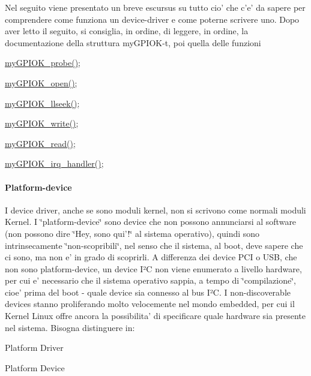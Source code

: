 Nel seguito viene presentato un breve escursus su tutto cio' che c'e' da sapere per comprendere come funziona un device-\/driver e come poterne scrivere uno. Dopo aver letto il seguito, si consiglia, in ordine, di leggere, in ordine, la documentazione della struttura my\+G\+P\+I\+O\+K-\/t, poi quella delle funzioni
\begin{DoxyItemize}
\item \hyperlink{group___kernel-_module_gae40973a06d72f7c41a9af07513a62307}{my\+G\+P\+I\+O\+K\+\_\+probe()};
\item \hyperlink{group___kernel-_module_gad013759c18fbf6ea96005b9b3bfa5b4e}{my\+G\+P\+I\+O\+K\+\_\+open()};
\item \hyperlink{group___kernel-_module_ga66e7f726b72320a272b633ecbaecefff}{my\+G\+P\+I\+O\+K\+\_\+llseek()};
\item \hyperlink{group___kernel-_module_ga1eea0f6c86e8966ba9b701da57502aad}{my\+G\+P\+I\+O\+K\+\_\+write()};
\item \hyperlink{group___kernel-_module_ga90ac339df9c02ae5f11a2a7727adc923}{my\+G\+P\+I\+O\+K\+\_\+read()};
\item \hyperlink{group___kernel-_module_ga2fc230a12a97aa63e43b2dc4aec73511}{my\+G\+P\+I\+O\+K\+\_\+irq\+\_\+handler()};
\end{DoxyItemize}

\paragraph*{Platform-\/device}

I device driver, anche se sono moduli kernel, non si scrivono come normali moduli Kernel. I \char`\"{}platform-\/device\char`\"{} sono device che non possono annunciarsi al software (non possono dire \char`\"{}\+Hey,
sono qui'!\char`\"{} al sistema operativo), quindi sono intrinsecamente \char`\"{}non-\/scopribili\char`\"{}, nel senso che il sistema, al boot, deve sapere che ci sono, ma non e' in grado di scoprirli. A differenza dei device P\+C\+I o U\+S\+B, che non sono platform-\/device, un device I²\+C non viene enumerato a livello hardware, per cui e' necessario che il sistema operativo sappia, a tempo di \char`\"{}compilazione\char`\"{}, cioe' prima del boot -\/ quale device sia connesso al bus I²\+C. I non-\/discoverable devices stanno proliferando molto velocemente nel mondo embedded, per cui il Kernel Linux offre ancora la possibilita' di specificare quale hardware sia presente nel sistema. Bisogna distinguere in\+:
\begin{DoxyItemize}
\item Platform Driver
\item Platform Device
\end{DoxyItemize}

